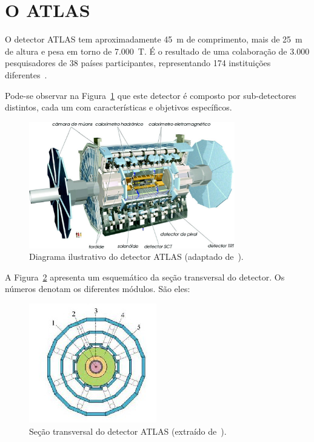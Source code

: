 \section{O ATLAS}

O detector ATLAS tem aproximadamente 45~m de comprimento, mais de 25~m de altura
e pesa em torno de 7.000~T. É o resultado de uma colaboração de 3.000
pesquisadores de 38 países participantes, representando 174 instituições
diferentes~\cite{ref:atlas_factsheet}\cite{GRAEL2011}.

Pode-se observar na Figura~\ref{fig:atlasschema} que este detector é composto
por sub-detectores distintos, cada um com características e
objetivos específicos.

\begin{figure}[H]
    \centering
    \includegraphics[width=0.8\textwidth]{images/ATLAS_esquema.png}
    \caption[Diagrama ilustrativo do detector ATLAS.]{Diagrama ilustrativo do
    detector ATLAS (adaptado de~\cite{ref:atlas_www}).}
    \label{fig:atlasschema}
\end{figure}

A Figura~\ref{fig:atlassection} apresenta um esquemático da seção transversal do
detector. Os números denotam os diferentes módulos. São eles:

\begin{figure}[H]
    \centering
    \includegraphics{images/atlas_transversal.png}
    \caption[Seção transversal do detector ATLAS.]{Seção transversal do detector
    ATLAS (extraído de~\cite{ref:TORRES}).}
    \label{fig:atlassection}
\end{figure}



